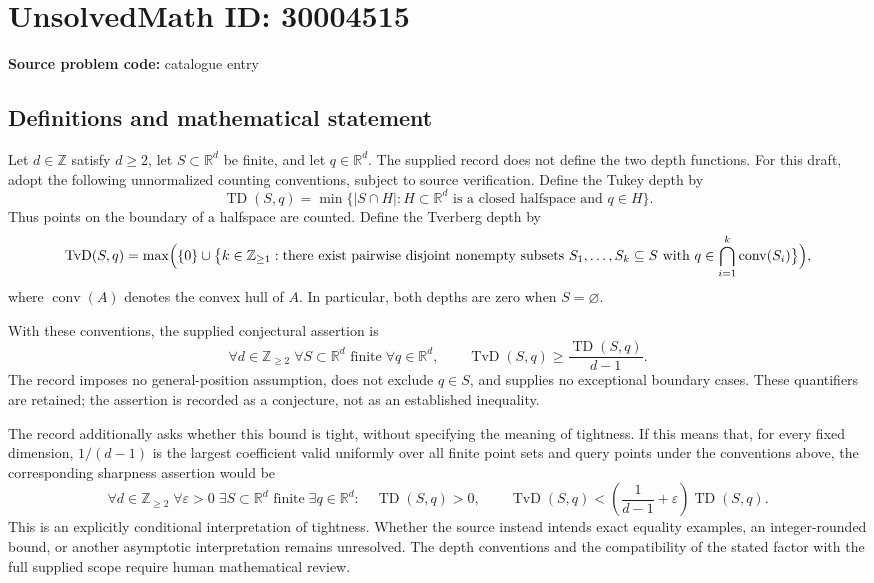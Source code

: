 \documentclass[11pt]{article}
\newcommand{\Z}{\mathbb{Z}}
\newcommand{\R}{\mathbb{R}}
\begin{document}
\section*{UnsolvedMath ID: 30004515}
\textbf{Source problem code:} catalogue entry
\subsection{Definitions and mathematical statement}
Let \(d\in\Z\) satisfy \(d\geq2\), let \(S\subset\R^d\) be finite, and let \(q\in\R^d\). The supplied record does not define the two depth functions. For this draft, adopt the following unnormalized counting conventions, subject to source verification. Define the Tukey depth by
\[
\operatorname{TD}(S,q)=\min\bigl\{|S\cap H|:H\subset\R^d\text{ is a closed halfspace and }q\in H\bigr\}.
\]
Thus points on the boundary of a halfspace are counted. Define the Tverberg depth by
\[
\operatorname{TvD}(S,q)=\max\Bigl(\{0\}\cup\bigl\{k\in\Z_{\geq1}:\text{there exist pairwise disjoint nonempty subsets }S_1,\ldots,S_k\subseteq S\text{ with }q\in\bigcap_{i=1}^k\operatorname{conv}(S_i)\bigr\}\Bigr),
\]
where \(\operatorname{conv}(A)\) denotes the convex hull of \(A\). In particular, both depths are zero when \(S=\varnothing\).

With these conventions, the supplied conjectural assertion is
\[
\forall d\in\Z_{\geq2}\;\forall S\subset\R^d\text{ finite}\;\forall q\in\R^d,\qquad
\operatorname{TvD}(S,q)\geq\frac{\operatorname{TD}(S,q)}{d-1}.
\]
The record imposes no general-position assumption, does not exclude \(q\in S\), and supplies no exceptional boundary cases. These quantifiers are retained; the assertion is recorded as a conjecture, not as an established inequality.

The record additionally asks whether this bound is tight, without specifying the meaning of tightness. If this means that, for every fixed dimension, \(1/(d-1)\) is the largest coefficient valid uniformly over all finite point sets and query points under the conventions above, the corresponding sharpness assertion would be
\[
\forall d\in\Z_{\geq2}\;\forall\varepsilon>0\;\exists S\subset\R^d\text{ finite}\;\exists q\in\R^d:\quad
\operatorname{TD}(S,q)>0,\qquad
\operatorname{TvD}(S,q)<\left(\frac1{d-1}+\varepsilon\right)\operatorname{TD}(S,q).
\]
This is an explicitly conditional interpretation of tightness. Whether the source instead intends exact equality examples, an integer-rounded bound, or another asymptotic interpretation remains unresolved. The depth conventions and the compatibility of the stated factor with the full supplied scope require human mathematical review.
\end{document}
